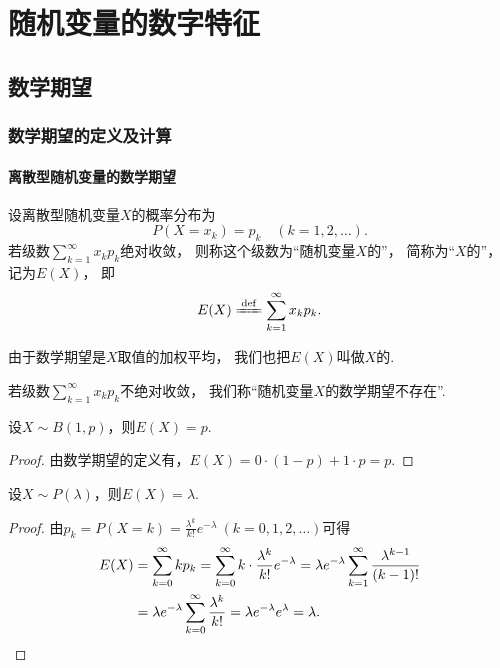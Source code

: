 \chapter{随机变量的数字特征}
\section{数学期望}
\subsection{数学期望的定义及计算}
\subsubsection{离散型随机变量的数学期望}
\begin{definition}
设离散型随机变量\(X\)的概率分布为\[
	P(X=x_k) = p_k
	\quad(k=1,2,\dotsc).
\]
若级数\(\sum_{k=1}^\infty x_k p_k\)绝对收敛，
则称这个级数为“随机变量\(X\)的”，
简称为“\(X\)的”，
记为\(E(X)\)，
即\begin{equation}\label{equation:随机变量的数字特征.数学期望的定义式}
	E(X) \defeq \sum_{k=1}^\infty x_k p_k.
\end{equation}

由于数学期望是\(X\)取值的加权平均，
我们也把\(E(X)\)叫做\(X\)的.

若级数\(\sum_{k=1}^\infty x_k p_k\)不绝对收敛，
我们称“随机变量\(X\)的数学期望不存在”.
\end{definition}

\begin{proposition}\label{theorem:随机变量的数字特征.0-1分布的数学期望}
设\(X \sim B(1,p)\)，则\(E(X) = p\).
\begin{proof}
由数学期望的定义有，\(E(X) = 0 \cdot (1-p) + 1 \cdot p = p\).
\end{proof}
\end{proposition}

\begin{proposition}\label{theorem:随机变量的数字特征.泊松分布的数学期望}
设\(X \sim P(\lambda)\)，则\(E(X) = \lambda\).
\begin{proof}
由\(p_k = P(X=k) = \frac{\lambda^k}{k!} e^{-\lambda}\ (k=0,1,2,\dotsc)\)可得
\begin{align*}
	E(X) &= \sum_{k=0}^\infty k p_k
	= \sum_{k=0}^\infty k \cdot \frac{\lambda^k}{k!} e^{-\lambda}
	= \lambda e^{-\lambda} \sum_{k=1}^\infty \frac{\lambda^{k-1}}{(k-1)!} \\
	&= \lambda e^{-\lambda} \sum_{k=0}^\infty \frac{\lambda^k}{k!}
	= \lambda e^{-\lambda} e^\lambda
	= \lambda.
	\qedhere
\end{align*}
\end{proof}
\end{proposition}


